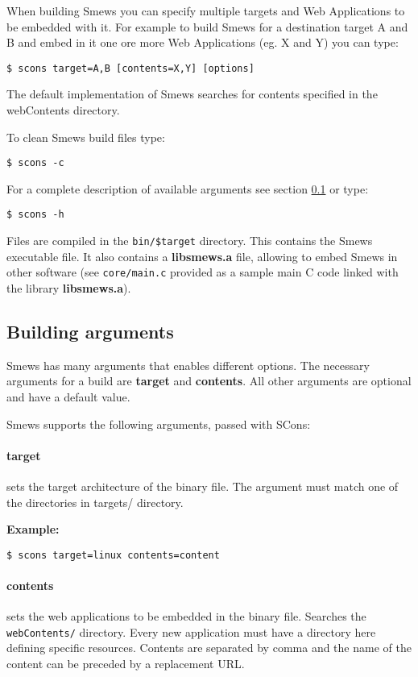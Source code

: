 \documentclass{report}
\begin{document}
When building Smews you can specify multiple targets and Web Applications to be embedded with it. For example to build Smews for a destination target A and B and embed in it one ore more Web Applications (eg. X and Y) you can type:

\begin{verbatim}
$ scons target=A,B [contents=X,Y] [options]
\end{verbatim}

The default implementation of Smews searches for contents specified in the webContents directory.

To clean Smews build files type:
\begin{verbatim}
$ scons -c
\end{verbatim}

For a complete description of available arguments see section \ref{sec:buildargs} or type:
\begin{verbatim}
$ scons -h
\end{verbatim}

Files are compiled in the \texttt{bin/\$target} directory. This contains the Smews
executable file. It also contains a \textbf{libsmews.a} file, allowing to embed Smews
in other software (see \texttt{core/main.c} provided as a sample main C code linked with the library \textbf{libsmews.a}).

\subsection{Building arguments}
\label{sec:buildargs}

Smews has many arguments that enables different options. The necessary arguments for a build are \textbf{target} and \textbf{contents}. All other arguments are optional and have a default value.

Smews supports the following arguments, passed with SCons:

\paragraph{target} sets the target architecture of the binary file. The argument must match one of the directories in targets/ directory.

\textbf{Example:} 
\begin{verbatim}
$ scons target=linux contents=content
\end{verbatim}

\paragraph{contents} sets the web applications to be embedded in the binary file. Searches the \texttt{webContents/} directory. Every new application must have a directory here defining specific resources. Contents are separated by comma and the name of the content can be preceded by a replacement URL.
\end{document}
